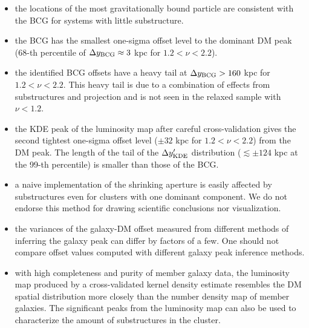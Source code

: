 \begin{itemize}
		\item the locations of the most gravitationally bound particle are consistent 
				with the BCG for systems with little substructure.  \\

		\item the BCG has the smallest one-sigma offset level to the dominant DM
			peak (68-th percentile of $\Delta y_{\rm BCG} \approx 3$ kpc for $1.2 <
			\nu < 2.2$).\\

		\item the identified BCG offsets have a heavy tail at $\Delta y_{\rm BCG} >
			160$ kpc for $1.2 < \nu < 2.2$. 
		 This heavy tail is due to a combination of effects from substructures and 
		 projection and is not seen in the relaxed sample with $\nu < 1.2$. \\

		\item the KDE peak of the luminosity map after careful cross-validation 
			gives the second tightest one-sigma offset level ($\pm 32$ kpc for $1.2 <
			\nu < 2.2$) from the DM peak.  
			The length of the tail of the $\Delta y_{\rm KDE}'$ distribution
			($\lesssim \pm 124$ kpc at the 99-th percentile)
			is smaller than those of the BCG.
			\\

		\item a naive implementation of the shrinking aperture is easily affected 
			by substructures even for clusters with one
			dominant component. We do not endorse this method for drawing scientific
			conclusions nor visualization.\\  

		\item the variances of the galaxy-DM offset measured from different methods
			of inferring the galaxy peak can differ by factors of a few. 
			One should not compare
			offset values computed with different galaxy peak inference methods.\\

		\item with high completeness and purity of member galaxy data, the
			luminosity map produced by a cross-validated kernel density estimate 
			resembles the DM spatial distribution more closely than 
			the number density map of member galaxies. The significant peaks from the 
			luminosity map can also be used to characterize the amount of substructures in
			the cluster.\\ 
\end{itemize}
